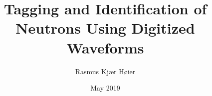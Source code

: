 \documentclass[12pt]{report}
\title{Tagging and Identification of Neutrons Using Digitized Waveforms}
\author{Rasmus Kjær Høier}
\date{May 2019}
\begin{document}
\maketitle

\newpage
\begin{abstract}
\end{abstract}
\newpage
\setcounter{tocdepth}{3}
\tableofcontents
\listoffigures
\listoftables



\newpage
{}
\setcounter{page}{1}
\clearpage
\clearpage
\clearpage
\clearpage

\clearpage

\end{document}
